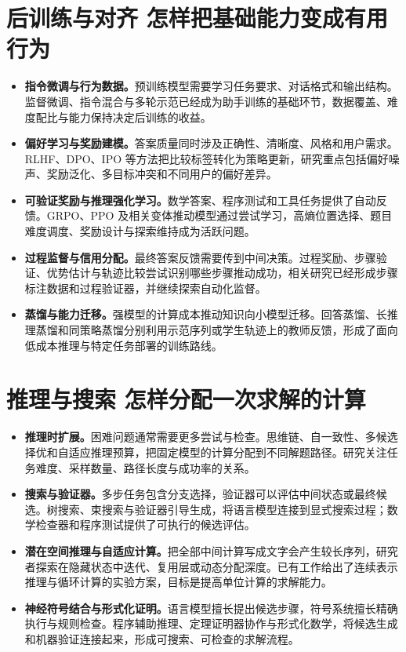 \section{后训练与对齐 怎样把基础能力变成有用行为}

\begin{itemize}
    \item \textbf{指令微调与行为数据。}预训练模型需要学习任务要求、对话格式和输出结构。监督微调、指令混合与多轮示范已经成为助手训练的基础环节，数据覆盖、难度配比与能力保持决定后训练的收益。
    \item \textbf{偏好学习与奖励建模。}答案质量同时涉及正确性、清晰度、风格和用户需求。RLHF、DPO、IPO 等方法把比较标签转化为策略更新，研究重点包括偏好噪声、奖励泛化、多目标冲突和不同用户的偏好差异。
    \item \textbf{可验证奖励与推理强化学习。}数学答案、程序测试和工具任务提供了自动反馈。GRPO、PPO 及相关变体推动模型通过尝试学习，高熵位置选择、题目难度调度、奖励设计与探索维持成为活跃问题。
    \item \textbf{过程监督与信用分配。}最终答案反馈需要传到中间决策。过程奖励、步骤验证、优势估计与轨迹比较尝试识别哪些步骤推动成功，相关研究已经形成步骤标注数据和过程验证器，并继续探索自动化监督。
    \item \textbf{蒸馏与能力迁移。}强模型的计算成本推动知识向小模型迁移。回答蒸馏、长推理蒸馏和同策略蒸馏分别利用示范序列或学生轨迹上的教师反馈，形成了面向低成本推理与特定任务部署的训练路线。
\end{itemize}

\section{推理与搜索 怎样分配一次求解的计算}

\begin{itemize}
    \item \textbf{推理时扩展。}困难问题通常需要更多尝试与检查。思维链、自一致性、多候选择优和自适应推理预算，把固定模型的计算分配到不同解题路径。研究关注任务难度、采样数量、路径长度与成功率的关系。
    \item \textbf{搜索与验证器。}多步任务包含分支选择，验证器可以评估中间状态或最终候选。树搜索、束搜索与验证器引导生成，将语言模型连接到显式搜索过程；数学检查器和程序测试提供了可执行的候选评估。
    \item \textbf{潜在空间推理与自适应计算。}把全部中间计算写成文字会产生较长序列，研究者探索在隐藏状态中迭代、复用层或动态分配深度。已有工作给出了连续表示推理与循环计算的实验方案，目标是提高单位计算的求解能力。
    \item \textbf{神经符号结合与形式化证明。}语言模型擅长提出候选步骤，符号系统擅长精确执行与规则检查。程序辅助推理、定理证明器协作与形式化数学，将候选生成和机器验证连接起来，形成可搜索、可检查的求解流程。
\end{itemize}


